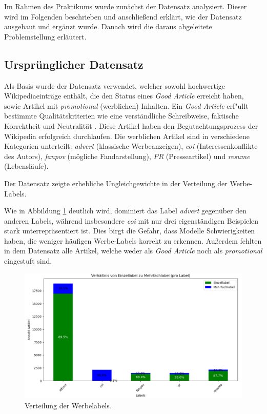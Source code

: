 Im Rahmen des Praktikums wurde zunächst der Datensatz analysiert. Dieser wird im Folgenden beschrieben und anschließend erklärt, wie der Datensatz ausgebaut und ergänzt wurde. Danach wird die daraus abgeleitete Problemstellung erläutert.

\subsection{Ursprünglicher Datensatz}
\label{UrsprunglicherDatensatz}
\label{ProblemeDatensatz}
Als Basis wurde der Datensatz \cite{Urbanbricks2020} verwendet, welcher sowohl hochwertige Wikipediaeinträge enthält, die den Status eines \emph{Good Article} erreicht haben, sowie Artikel mit \textit{promotional} (werblichen) Inhalten. Ein \emph{Good Article} erf"ullt bestimmte Qualitätskriterien wie eine verständliche Schreibweise, faktische Korrektheit und Neutralität \cite{WikiGA}. Diese Artikel haben den Begutachtungsprozess der Wikipedia erfolgreich durchlaufen. Die werblichen Artikel sind in verschiedene Kategorien unterteilt: \emph{advert} (klassische Werbeanzeigen), \emph{coi} (Interessenkonflikte des Autors), \emph{fanpov} (mögliche Fandarstellung), \emph{PR} (Presseartikel) und \emph{resume} (Lebensläufe).

Der Datensatz zeigte erhebliche Ungleichgewichte in der Verteilung der Werbe-Labels.

Wie in Abbildung \ref{fig:labelverteilung} deutlich wird, dominiert das Label \emph{advert} gegenüber den anderen Labels, während insbesondere \emph{coi} mit nur drei eigenständigen Beispielen stark unterrepräsentiert ist. Dies birgt die Gefahr, dass Modelle Schwierigkeiten haben, die weniger häufigen Werbe-Labels korrekt zu erkennen. Außerdem fehlten in dem Datensatz alle Artikel, welche weder als \emph{Good Article} noch als \emph{promotional} eingestuft sind.

\begin{figure}[H]
    \centering
    \includegraphics[width=0.7\linewidth]{figures/labelverteilung.png}
    \caption{Verteilung der Werbelabels.}
    \label{fig:labelverteilung}
\end{figure}


